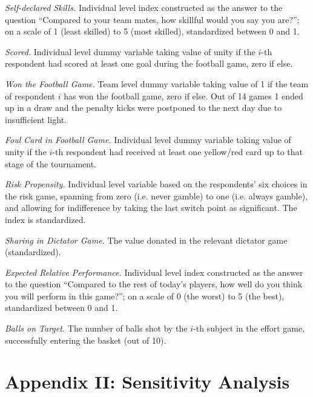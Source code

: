 \textit{Self-declared Skills.} Individual level index constructed as the answer to the question ``Compared to your team mates, how skillful would you say you are?''; on a scale of 1 (least skilled) to 5 (most skilled), standardized between 0 and 1. 

\textit{Scored.} Individual level dummy variable taking value of unity if the $i$-th respondent had scored at least one goal during the football game, zero if else.

\textit{Won the Football Game.} Team level dummy variable taking value of 1 if the team of respondent $i$ has won the football game, zero if else. Out of 14 games 1 ended up in a draw and the penalty kicks were postponed to the next day due to insufficient light.

\textit{Foul Card in Football Game.} Individual level dummy variable taking value of unity if the $i$-th respondent had received at least one yellow/red card up to that stage of the tournament.

\textit{Risk Propensity.} Individual level variable based on the respondents’ six choices in the risk game, spanning from zero (i.e. never gamble) to one (i.e. always gamble), and allowing for indifference by taking the last switch point as significant. The index is standardized.

\textit{Sharing in Dictator Game.} The value donated in the relevant dictator game (standardized).

\textit{Expected Relative Performance.} Individual level index constructed as the answer to the question ``Compared to the rest of today’s players, how well do you think you will perform in this game?''; on a scale of 0 (the worst) to 5 (the best), standardized between 0 and 1. 

\textit{Balls on Target.} The number of balls shot by the $i$-th subject in the effort game, successfully entering the basket (out of 10).
\clearpage

\section{Appendix II: Sensitivity Analysis}
\setcounter{table}{0}
\renewcommand{\thetable}{\arabic{chapter}.A\arabic{table}}

